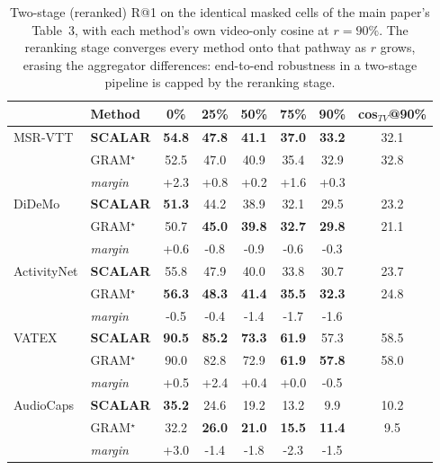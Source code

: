 \documentclass[10pt,twocolumn,letterpaper]{article}
\newcommand{\ours}{SCALAR}
\begin{document}
\begin{table}[t]
\centering
\caption{Two-stage (reranked) R@1 on the identical masked cells of the main
paper's Table~3, with each method's own video-only cosine at $r{=}90\%$. The
reranking stage converges every method onto that pathway as $r$ grows, erasing
the aggregator differences: end-to-end robustness in a two-stage pipeline is
capped by the reranking stage.}
\label{tab:missing_twostage}
\small
\setlength{\tabcolsep}{4pt}
\begin{tabular}{llcccccc}
\toprule
 & Method & 0\% & 25\% & 50\% & 75\% & 90\% & cos$_{TV}$@90\% \\
\midrule
MSR-VTT & \textbf{\ours{}} & \textbf{54.8} & \textbf{47.8} & \textbf{41.1} & \textbf{37.0} & \textbf{33.2} & 32.1 \\
 & GRAM$^{\star}$ & 52.5 & 47.0 & 40.9 & 35.4 & 32.9 & 32.8 \\
\rowcolor{gray!10} & \emph{margin} & +2.3 & +0.8 & +0.2 & +1.6 & +0.3 &  \\
\midrule
DiDeMo & \textbf{\ours{}} & \textbf{51.3} & 44.2 & 38.9 & 32.1 & 29.5 & 23.2 \\
 & GRAM$^{\star}$ & 50.7 & \textbf{45.0} & \textbf{39.8} & \textbf{32.7} & \textbf{29.8} & 21.1 \\
\rowcolor{gray!10} & \emph{margin} & +0.6 & -0.8 & -0.9 & -0.6 & -0.3 &  \\
\midrule
ActivityNet & \textbf{\ours{}} & 55.8 & 47.9 & 40.0 & 33.8 & 30.7 & 23.7 \\
 & GRAM$^{\star}$ & \textbf{56.3} & \textbf{48.3} & \textbf{41.4} & \textbf{35.5} & \textbf{32.3} & 24.8 \\
\rowcolor{gray!10} & \emph{margin} & -0.5 & -0.4 & -1.4 & -1.7 & -1.6 &  \\
\midrule
VATEX & \textbf{\ours{}} & \textbf{90.5} & \textbf{85.2} & \textbf{73.3} & \textbf{61.9} & 57.3 & 58.5 \\
 & GRAM$^{\star}$ & 90.0 & 82.8 & 72.9 & \textbf{61.9} & \textbf{57.8} & 58.0 \\
\rowcolor{gray!10} & \emph{margin} & +0.5 & +2.4 & +0.4 & +0.0 & -0.5 &  \\
\midrule
AudioCaps & \textbf{\ours{}} & \textbf{35.2} & 24.6 & 19.2 & 13.2 & 9.9 & 10.2 \\
 & GRAM$^{\star}$ & 32.2 & \textbf{26.0} & \textbf{21.0} & \textbf{15.5} & \textbf{11.4} & 9.5 \\
\rowcolor{gray!10} & \emph{margin} & +3.0 & -1.4 & -1.8 & -2.3 & -1.5 &  \\
\bottomrule
\end{tabular}
\end{table}
\end{document}
